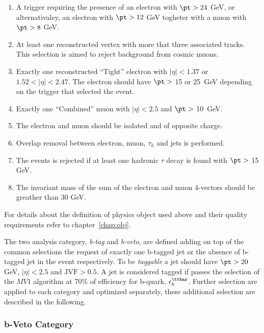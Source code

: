 \begin{enumerate}[label=(\roman*)]
\item A trigger requiring the presence of an electron with $\pt > 24$ GeV, or alternativaley,
	an electron with  $\pt > 12$ GeV togheter with a muon with  $\pt > 8$ GeV. 

\item At least one reconstructed vertex with more that three associated tracks. This selection is aimed to 
	reject background from cosmic muons.

\item Exactly one reconstructed ``Tight'' electron with $|\eta| < 1.37 $ or $1.52 < |\eta| < 2.47$.
	The electron  should have $\pt > $ 15 or 25~GeV depending on the trigger that selected the event. 

\item Exactly one ``Combined'' muon with $|\eta| < 2.5$ and  $\pt > $ 10~GeV.

\item The electron and muon should be isolated and of opposite charge.

\item Overlap removal between electron, muon, $\tau_h$ and jets is performed.

\item The events is rejected if at least one hadronic $\tau$ decay is found with $\pt > $ 15 GeV.

\item The invariant mass of the sum of the electron and muon 4-vectors should be greather than 30 GeV.

\end{enumerate}
For details about the definition of physics object used above and their quality requirements  refer to chapter~\ref{chap:obj}.
 
The two analysis category, \emph{b-tag} and \emph{b-veto}, are defined adding on top of the common selections 
the request of exactly one b-tagged jet or the absence of b-tagged jet in the event respectively. To be 
\emph{taggable} a jet should have $\pt > 20$ GeV, $|\eta| < 2.5$ and $\text{JVF} > 0.5$.
A jet is considered tagged if passes the selection of the $MV1$ algorithm at 70\% of efficiency for b-quark, 
$\epsilon_b^{\ttbar}$. Further selection
are applied to each category and optimized separately, these additional selection are described in the following.

\subsubsection{b-Veto Category}\label{sec:veto}

